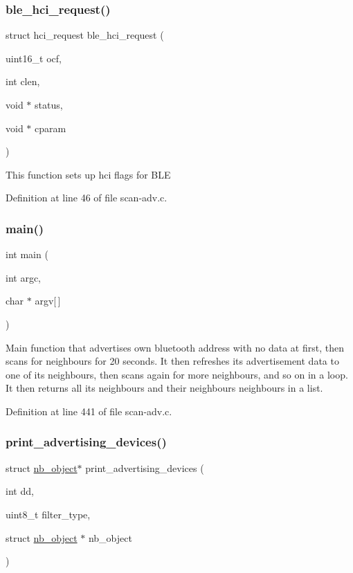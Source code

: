\subsubsection{\texorpdfstring{ble\+\_\+hci\+\_\+request()}{ble\_hci\_request()}}
{\footnotesize\ttfamily struct hci\+\_\+request ble\+\_\+hci\+\_\+request (\begin{DoxyParamCaption}\item[{uint16\+\_\+t}]{ocf,  }\item[{int}]{clen,  }\item[{void $\ast$}]{status,  }\item[{void $\ast$}]{cparam }\end{DoxyParamCaption})}

This function sets up hci flags for B\+LE 

Definition at line 46 of file scan-\/adv.\+c.

\mbox{\label{scan-adv_8c_a0ddf1224851353fc92bfbff6f499fa97}} 
\subsubsection{\texorpdfstring{main()}{main()}}
{\footnotesize\ttfamily int main (\begin{DoxyParamCaption}\item[{int}]{argc,  }\item[{char $\ast$}]{argv\mbox{[}$\,$\mbox{]} }\end{DoxyParamCaption})}

Main function that advertises own bluetooth address with no data at first, then scans for neighbours for 20 seconds. It then refreshes its advertisement data to one of its neighbours, then scans again for more neighbours, and so on in a loop. It then returns all its neighbours and their neighbours neighbours in a list. 

Definition at line 441 of file scan-\/adv.\+c.

\mbox{\label{scan-adv_8c_a9ed8193ef016bf2e85c78d6eacc2caf6}} 
\subsubsection{\texorpdfstring{print\+\_\+advertising\+\_\+devices()}{print\_advertising\_devices()}}
{\footnotesize\ttfamily struct \mbox{\hyperlink{structnb__object}{nb\+\_\+object}}$\ast$ print\+\_\+advertising\+\_\+devices (\begin{DoxyParamCaption}\item[{int}]{dd,  }\item[{uint8\+\_\+t}]{filter\+\_\+type,  }\item[{struct \mbox{\hyperlink{structnb__object}{nb\+\_\+object}} $\ast$}]{nb\+\_\+object }\end{DoxyParamCaption})}

